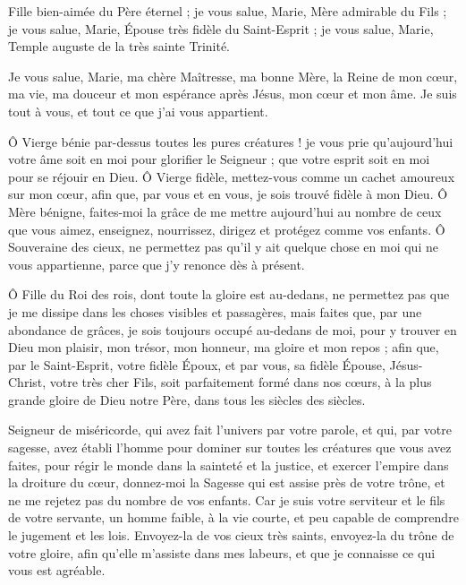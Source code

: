 \documentclass{bibliotheca-missel}
\begin{document}
 Fille bien-aimée du Père éternel ; je vous salue, Marie, Mère admirable du Fils ; je vous salue, Marie, Épouse très fidèle du Saint-Esprit ; je vous salue, Marie, Temple auguste de la très sainte Trinité.

Je vous salue, Marie, ma chère Maîtresse, ma bonne Mère, la Reine de mon cœur, ma vie, ma douceur et mon espérance après Jésus, mon cœur et mon âme. Je suis tout à vous, et tout ce que j’ai vous appartient.

Ô Vierge bénie par-dessus toutes les pures créatures ! je vous prie qu’aujourd’hui votre âme soit en moi pour glorifier le Seigneur ; que votre esprit soit en moi pour se réjouir en Dieu. Ô Vierge fidèle, mettez-vous comme un cachet amoureux sur mon cœur, afin que, par vous et en vous, je sois trouvé fidèle à mon Dieu. Ô Mère bénigne, faites-moi la grâce de me mettre aujourd’hui au nombre de ceux que vous aimez, enseignez, nourrissez, dirigez et protégez comme vos enfants. Ô Souveraine des cieux, ne permettez pas qu’il y ait quelque chose en moi qui ne vous appartienne, parce que j’y renonce dès à présent.

Ô Fille du Roi des rois, dont toute la gloire est au-dedans, ne permettez pas que je me dissipe dans les choses visibles et passagères, mais faites que, par une abondance de grâces, je sois toujours occupé au-dedans de moi, pour y trouver en Dieu mon plaisir, mon trésor, mon honneur, ma gloire et mon repos ; afin que, par le Saint-Esprit, votre fidèle Époux, et par vous, sa fidèle Épouse, Jésus-Christ, votre très cher Fils, soit parfaitement formé dans nos cœurs, à la plus grande gloire de Dieu notre Père, dans tous les siècles des siècles.

 Seigneur de miséricorde, qui avez fait l’univers par votre parole, et qui, par votre sagesse, avez établi l’homme pour dominer sur toutes les créatures que vous avez faites, pour régir le monde dans la sainteté et la justice, et exercer l’empire dans la droiture du cœur, donnez-moi la Sagesse qui est assise près de votre trône, et ne me rejetez pas du nombre de vos enfants. Car je suis votre serviteur et le fils de votre servante, un homme faible, à la vie courte, et peu capable de comprendre le jugement et les lois. Envoyez-la de vos cieux très saints, envoyez-la du trône de votre gloire, afin qu’elle m’assiste dans mes labeurs, et que je connaisse ce qui vous est agréable.
\end{document}
